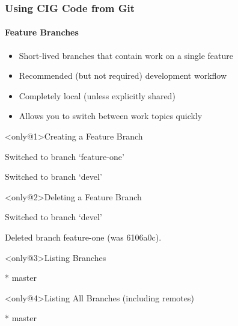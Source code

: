 \begin{frame}[fragile,t]
 \frametitle{Using CIG Code from Git}
 \framesubtitle{Feature Branches}

 \begin{itemize}
  \item Short-lived branches that contain work on a single feature
  \item Recommended (but not required) development workflow
  \item Completely local (unless explicitly shared)
  \item Allows you to switch between work topics quickly
 \end{itemize}

 \begin{minipage}[t][0.45\textheight][t]{0.97\textwidth}
 \vspace{-1em}
 \begin{exampleblock}<only@1>{Creating a Feature Branch}
  \vspace{-1em}
  \begin{semiverbatim}\small
{}
Switched to branch `feature-one'

Switched to branch `devel'
\end{semiverbatim}
 \end{exampleblock}

 \begin{exampleblock}<only@2>{Deleting a Feature Branch}
  \vspace{-1em}
  \begin{semiverbatim}\small
{}
Switched to branch `devel'

Deleted branch feature-one (was 6106a0c).
\end{semiverbatim}
 \end{exampleblock}

 \begin{exampleblock}<only@3>{Listing Branches}
  \vspace{-1em}
  \begin{semiverbatim}\small
{}
* 
  master
\end{semiverbatim}
 \end{exampleblock}

 \begin{exampleblock}<only@4>{Listing All Branches (including remotes)}
  \vspace{-1em}
  \begin{semiverbatim}\small
{}
* 
  master
\end{semiverbatim}
 \end{exampleblock}
 \end{minipage}
\end{frame}

